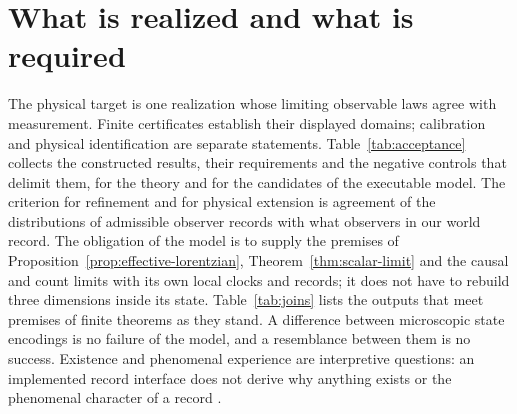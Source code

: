 \documentclass[11pt]{article}
\theoremstyle{definition}
\theoremstyle{remark}
\begin{document}


\section{What is realized and what is required}
\label{sec:scoreboard}

The physical target is one realization whose limiting observable laws agree
with measurement. Finite certificates establish their displayed domains;
calibration and physical identification are separate statements.
Table~\ref{tab:acceptance} collects the constructed results, their
requirements and the negative controls that delimit them, for the theory
and for the candidates of the executable model. The criterion for refinement and for
physical extension is agreement of the distributions of admissible
observer records with what observers in our world record. The obligation
of the model is to supply the premises of
Proposition~\ref{prop:effective-lorentzian}, Theorem~\ref{thm:scalar-limit}
and the causal and count limits with its own local clocks and records; it
does not have to rebuild three dimensions inside its state.
Table~\ref{tab:joins} lists the outputs that meet premises of finite
theorems as they stand. A difference between microscopic state encodings
is no failure of the model, and a resemblance between them is no success.
Existence and phenomenal experience are interpretive questions: an
implemented record interface does not derive why anything exists or the
phenomenal character of a record \cite{ophspine}.
\end{document}
